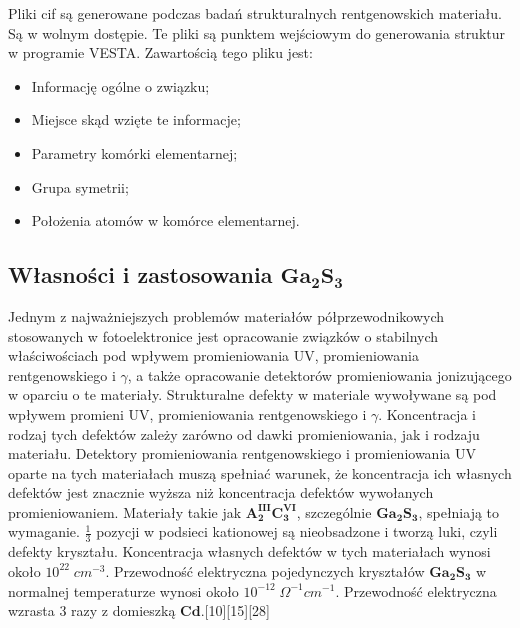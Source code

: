 Pliki cif są generowane podczas badań strukturalnych rentgenowskich materiału. Są w wolnym dostępie. Te pliki są punktem wejściowym do generowania struktur w programie VESTA. Zawartością tego pliku jest:
\begin{itemize}
	\item Informację ogólne o związku;
	\item Miejsce skąd wzięte te informacje;
	\item Parametry komórki elementarnej;
	\item Grupa symetrii;
	\item Położenia atomów w komórce elementarnej. 
\end{itemize} 

\subsection{Własności i zastosowania $\mathbf{Ga_{2}S_{3}}$}
Jednym z najważniejszych problemów materiałów półprzewodnikowych stosowanych w fotoelektronice jest opracowanie związków o stabilnych właściwościach pod wpływem promieniowania UV, promieniowania rentgenowskiego i $\gamma$, a także opracowanie detektorów promieniowania jonizującego w oparciu o te materiały. Strukturalne defekty w materiale wywoływane są pod wpływem promieni UV, promieniowania rentgenowskiego i $\gamma$. Koncentracja i rodzaj tych defektów zależy zarówno od dawki promieniowania, jak i rodzaju materiału. Detektory promieniowania rentgenowskiego i promieniowania UV oparte na tych materiałach muszą spełniać warunek, że koncentracja ich własnych defektów jest znacznie wyższa niż koncentracja defektów wywołanych promieniowaniem. Materiały takie jak $\mathbf{A_{2}^{III}C_{3}^{VI}}$, szczególnie $\mathbf{Ga_{2}S_{3}}$, spełniają to wymaganie. $\frac{1}{3}$ pozycji w podsieci kationowej są nieobsadzone i tworzą luki, czyli defekty kryształu. Koncentracja własnych defektów w tych materiałach wynosi około $10^{22}\;cm^{-3}$. Przewodność elektryczna pojedynczych kryształów $\mathbf{Ga_{2}S_{3}}$ w normalnej temperaturze wynosi około $10^{-12}\;\Omega^{-1}cm^{-1}$. Przewodność elektryczna wzrasta 3 razy z domieszką $\mathbf{Cd}$.[10][15][28]
